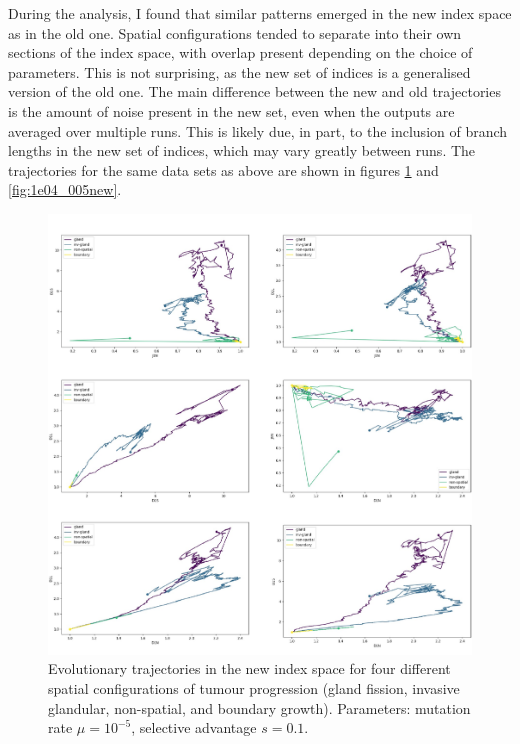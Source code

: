 During the analysis, I found that similar patterns emerged in the new index
space as in the old one. Spatial configurations tended to separate into their
own sections of the index space, with overlap present depending on the choice
of parameters. This is not surprising, as the new set of indices is a
generalised version of the old one. The main difference between the new and old
trajectories is the amount of noise present in the new set, even when the
outputs are averaged over multiple runs. This is likely due, in part, to the
inclusion of branch lengths in the new set of indices, which may vary greatly
between runs. The trajectories for the same data sets as above are shown in
figures \ref{fig:1e05_01new} and \ref{fig:1e04_005new}.

\begin{figure}[h!]
    \centering
    \includegraphics[width=\textwidth]{Chapter_3/figures/1e0501new.pdf}
    \caption{Evolutionary trajectories in the new index space for four
    different spatial configurations of tumour progression (gland fission,
    invasive glandular, non-spatial, and boundary growth). Parameters: mutation
    rate $\mu = 10^{-5}$, selective advantage $s = 0.1$.}
    \label{fig:1e05_01new}
\end{figure}
